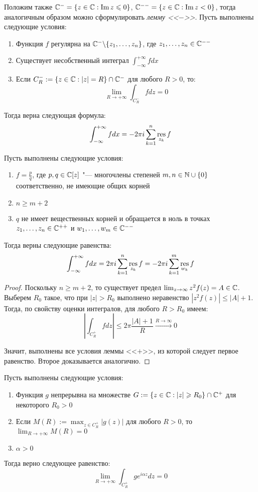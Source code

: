 \begin{note}
	Положим также $\mathbb{C}^- = \{z \in \mathbb{C}: \operatorname{Im} z \leqslant 0\}$, $\mathbb{C}^{--} = \{z \in \mathbb{C}: \operatorname{Im} z < 0\}$, тогда аналогичным образом можно сформулировать \textit{лемму <<$-$>>}. Пусть выполнены следующие условия:
	\begin{enumerate}
		\item Функция $f$ регулярна на $\mathbb{C}^- \backslash \{z_1, \dotsc, z_n\}$, где $z_1, \dotsc, z_n \in \mathbb{C}^{--}$
		\item Существует несобственный интеграл $\int_{-\infty}^{+\infty}fdx$
		\item Если $C_R^- := \{z \in \mathbb{C}: |z| = R\} \cap \mathbb{C}^-$ для любого $R > 0$, то:
		\[\lim_{R\to +\infty} \int_{C_R^-}fdz = 0\]
	\end{enumerate}
	
	Тогда верна следующая формула:
	\[\int_{-\infty}^{+\infty}fdx = -2\pi i\sum_{k = 1}^n\operatorname*{res}_{z_k}{f}\]
\end{note}

\begin{theorem}
	Пусть выполнены следующие условия:
	\begin{enumerate}
		\item $f = \frac pq$, где $p, q \in \mathbb{C}[z]$ "--- многочлены степеней $m, n \in \mathbb{N} \cup \{0\}$ соответственно, не имеющие общих корней
		\item $n \ge m + 2$
		\item $q$ не имеет вещественных корней и обращается в ноль в точках $z_1, \dotsc, z_n \in \mathbb{C}^{++}$ и $w_1, \dotsc, w_m \in \mathbb{C}^{--}$
	\end{enumerate}
	
	Тогда верны следующие равенства:
	\[\int_{-\infty}^{+\infty}fdx = 2\pi i\sum_{k=1}^n \operatorname*{res}_{z_k}f = -2\pi i\sum_{k=1}^m \operatorname*{res}_{w_k}f\]
\end{theorem}

\begin{proof}
	Поскольку $n \ge m + 2$, то существует предел $\lim_{z \to \infty}z^2f(z) = A \in \mathbb{C}$. Выберем $R_0$ такое, что при $|z| > R_0$ выполнено неравенство $|z^2f(z)| \le |A| + 1$. Тогда, по свойству оценки интегралов, для любого $R > R_0$ имеем:
	\[\left|\int_{C_R^+}fdz\right| \le 2\pi\frac{|A| + 1}{R} \xrightarrow{R \to \infty} 0\]
	
	Значит, выполнены все условия леммы <<$+$>>, из которой следует первое равенство. Второе доказывается аналогично.
\end{proof}

\begin{proposition}
	Пусть выполнены следующие условия:
	\begin{enumerate}
		\item Функция $g$ непрерывна на множестве $G := \{z \in \mathbb{C} : |z| \geqslant R_0\} \cap \mathbb{C}^+$ для некоторого $R_0 > 0$
		\item Если $M(R) := \max_{z \in C_R^+}|g(z)|$ для любого $R>0$, то $\lim_{R \to +\infty}M(R) = 0$
		\item $\alpha > 0$
	\end{enumerate}
	
	Тогда верно следующее равенство:
	\[\lim_{R \to +\infty} \int_{C_R^+}ge^{i\alpha z}dz = 0\]
\end{proposition}

